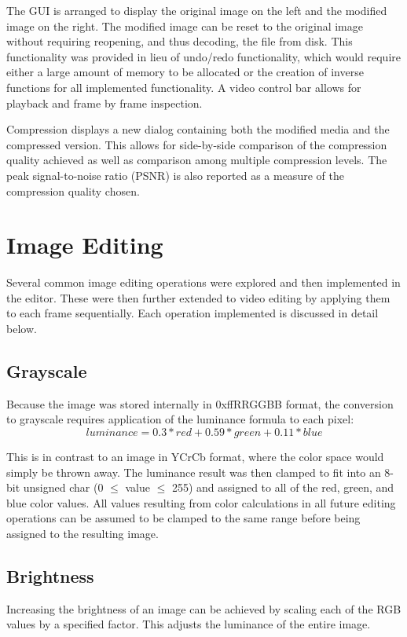 \documentclass[10pt,twocolumn,twoside]{IEEEtran}
\begin{document}
The GUI is arranged to display the original image on the left and the modified image on the right. The 
modified image can be reset to the original image without requiring reopening, and thus decoding, the file 
from disk. This functionality was provided in lieu of undo/redo functionality, which would require either a 
large amount of memory to be allocated or the creation of inverse functions for all implemented functionality. 
A video control bar allows for playback and frame by frame inspection.

Compression displays a new dialog containing both the modified media and the compressed version. This allows 
for side-by-side comparison of the compression quality achieved as well as comparison among multiple 
compression levels. The peak signal-to-noise ratio (PSNR) is also reported as a measure of the compression 
quality chosen.

\section{Image Editing}
Several common image editing operations were explored and then implemented in the editor. These were then 
further extended to video editing by applying them to each frame sequentially. Each operation implemented is 
discussed in detail below.

\subsection{Grayscale}
Because the image was stored internally in 0xffRRGGBB format, the conversion to grayscale requires application 
of the luminance formula to each pixel: \begin{equation*}luminance = 0.3*red + 0.59*green + 0.11*blue \end
{equation*}

This is in contrast to an image in YCrCb format, where the color space would simply be thrown away. The 
luminance result was then clamped to fit into an 8-bit unsigned char (0 $\leq$ value $\leq$ 255) and assigned 
to all of the red, green, and blue color values. All values resulting from color calculations in all future 
editing operations can be assumed to be clamped to the same range before being assigned to the resulting 
image. 

\subsection{Brightness}
Increasing the brightness of an image can be achieved by scaling each of the RGB values by a specified factor. 
This adjusts the luminance of the entire image.
\end{document}
